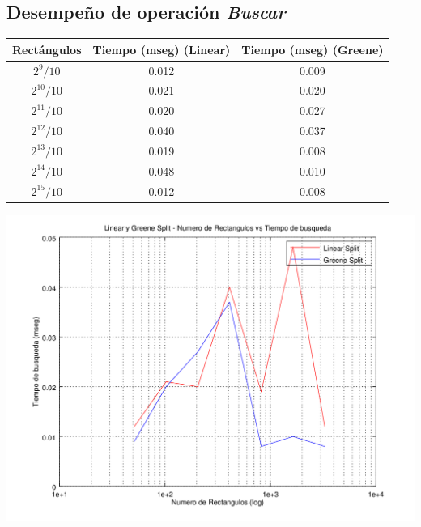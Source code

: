\documentclass[letterpaper,10pt]{article}
\begin{document}
	\newpage

	\subsection{Desempeño de operación \textit{Buscar}}

	\begin{center}

		\begin{tabular}{|c|c||c|}
			\hline
			Rectángulos	& Tiempo (mseg) (Linear) & Tiempo (mseg) (Greene) \\
			\hline
			$2^{9}/10$ 	& 0.012	& 0.009\\
			\hline
			$2^{10}/10$ 	& 0.021	& 0.020\\
			\hline
			$2^{11}/10$ 	& 0.020	& 0.027\\
			\hline
			$2^{12}/10$ 	& 0.040	& 0.037\\
			\hline
			$2^{13}/10$ 	& 0.019	& 0.008\\
			\hline
			$2^{14}/10$ 	& 0.048	& 0.010\\
			\hline
			$2^{15}/10$ 	& 0.012	& 0.008\\
			\hline
		\end{tabular}

		\includegraphics[width=0.75\textheight]{fig3.png}
	\end{center}
\end{document}
